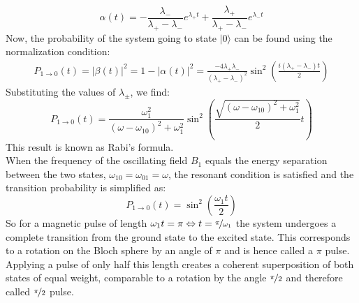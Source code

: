 \documentclass[12pt,a4paper]{article}
\begin{document}
\begin{equation}
\alpha(t)=-\frac{\lambda_-}{\lambda_+-\lambda_-}e^{\lambda_+t}+\frac{\lambda_+}{\lambda_+-\lambda_-}e^{\lambda_-t}
\end{equation}
Now, the probability of the system going to state $|0\rangle$ can be found using the normalization condition:
\begin{align}
P_{1\rightarrow 0}(t)=|\beta(t)|^2=1-|\alpha(t)|^2
=\frac{-4\lambda_+\lambda_-}{(\lambda_+-\lambda_-)^2}\sin^2\left(\frac{i(\lambda_+-\lambda_-)t}{2}\right)
\end{align}
Substituting the values of $\lambda_\pm$, we find:
\begin{equation}
P_{1\rightarrow 0}(t)=\frac{\omega_1^2}{(\omega-\omega_{10})^2+\omega_1^2}\sin^2\left(\frac{\sqrt{(\omega-\omega_{10})^2+\omega_1^2}}{2}t\right)
\end{equation}
This result is known as Rabi's formula. \\
When the frequency of the oscillating field $B_1$ equals the energy separation between the two states, $\omega_{10}=\omega_{01}=\omega$, the resonant condition is satisfied and the transition probability is simplified as:
\begin{equation}
P_{1\rightarrow 0}(t)=\sin^2\left(\frac{\omega_1 t}{2}\right)
\end{equation}
So for a magnetic pulse of length $\omega_1 t=\pi \Leftrightarrow t=\nicefrac{\pi}{\omega_1}$ the system undergoes a complete transition from the ground state to the excited state. This corresponds to a rotation on the Bloch sphere by an angle of $\pi$ and is hence called a $\pi$ pulse. Applying a pulse of only half this length creates a coherent superposition of both states of equal weight, comparable to a rotation by the angle $\nicefrac{\pi}{2}$ and therefore called $\nicefrac{\pi}{2}$ pulse.
\end{document}
